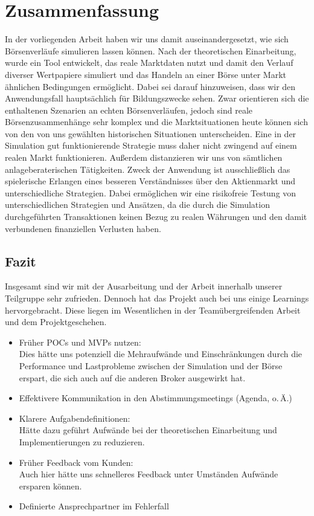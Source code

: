 \chapter{Zusammenfassung}

In der vorliegenden Arbeit haben wir uns damit auseinandergesetzt, wie sich Börsenverläufe simulieren lassen können.
Nach der theoretischen Einarbeitung, wurde ein Tool entwickelt, das reale Marktdaten nutzt und damit den Verlauf diverser Wertpapiere simuliert und das Handeln an einer Börse unter Markt ähnlichen Bedingungen ermöglicht. Dabei sei darauf hinzuweisen, dass wir den Anwendungsfall hauptsächlich für Bildungszwecke sehen. Zwar orientieren sich die enthaltenen Szenarien an echten Börsenverläufen, jedoch sind reale Börsenzusammenhänge sehr komplex und die Marktsituationen heute können sich von den von uns gewählten historischen Situationen unterscheiden. Eine in der Simulation gut funktionierende Strategie muss daher nicht zwingend auf einem realen Markt funktionieren. Außerdem distanzieren wir uns von sämtlichen anlageberaterischen Tätigkeiten. Zweck der Anwendung ist ausschließlich das spielerische Erlangen eines besseren Verständnisses über den Aktienmarkt und unterschiedliche Strategien. Dabei ermöglichen wir eine risikofreie Testung von unterschiedlichen Strategien und Ansätzen, da die durch die Simulation durchgeführten Transaktionen keinen Bezug zu realen Währungen und den damit verbundenen finanziellen Verlusten haben. 

\section{Fazit}
Insgesamt sind wir mit der Ausarbeitung und der Arbeit innerhalb unserer Teilgruppe sehr zufrieden. Dennoch hat das Projekt auch bei uns einige Learnings hervorgebracht. Diese liegen im Wesentlichen in der Teamübergreifenden Arbeit und dem Projektgeschehen. 

	\begin{itemize}
		\item Früher POCs und MVPs nutzen: \\
			Dies hätte uns potenziell die Mehraufwände und Einschränkungen durch die Performance und Lastprobleme zwischen der Simulation und der Börse erspart, die sich auch auf die anderen Broker ausgewirkt hat. 
		\item Effektivere Kommunikation in den Abstimmungsmeetings (Agenda, o.\,Ä.)
		\item Klarere Aufgabendefinitionen: \\
			Hätte dazu geführt Aufwände bei der theoretischen Einarbeitung und Implementierungen zu reduzieren.
		\item Früher Feedback vom Kunden: \\
			Auch hier hätte uns schnelleres Feedback unter Umständen Aufwände ersparen können. 
		\item Definierte Ansprechpartner im Fehlerfall
		
	\end{itemize}

